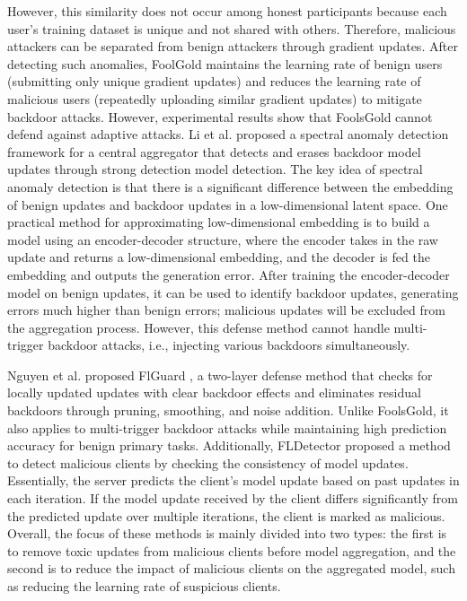\documentclass[conference]{IEEEtran}
\begin{document}
However, this similarity does not occur among honest participants because each user's training dataset is unique and not shared with others. 
Therefore, malicious attackers can be separated from benign attackers through gradient updates. After detecting such anomalies, 
FoolGold maintains the learning rate of benign users (submitting only unique gradient updates) and reduces the learning rate of malicious users 
(repeatedly uploading similar gradient updates) to mitigate backdoor attacks. However, experimental results show that 
FoolsGold cannot defend against adaptive attacks. Li et al. \cite{b79} proposed a spectral anomaly detection framework for a 
central aggregator that detects and erases backdoor model updates through strong detection model detection. 
The key idea of spectral anomaly detection is that there is a significant difference between the embedding 
of benign updates and backdoor updates in a low-dimensional latent space. One practical method for approximating 
low-dimensional embedding is to build a model using an encoder-decoder structure, where the encoder takes 
in the raw update and returns a low-dimensional embedding, and the decoder is fed the embedding and outputs 
the generation error. After training the encoder-decoder model on benign updates, it can be used to identify 
backdoor updates, generating errors much higher than benign errors; malicious updates will be excluded from 
the aggregation process. However, this defense method cannot handle multi-trigger backdoor attacks, i.e., 
injecting various backdoors simultaneously.   

Nguyen et al. proposed FlGuard \cite{b80}, a two-layer defense method that checks 
for locally updated updates with clear backdoor effects and eliminates residual backdoors through pruning, smoothing, and noise 
addition. Unlike FoolsGold\cite{b78}, it also applies to multi-trigger backdoor attacks while maintaining high prediction accuracy for benign primary tasks. 
Additionally, FLDetector \cite{b81} proposed a method to detect malicious clients by checking the consistency of model updates. Essentially, 
the server predicts the client's model update based on past updates in each iteration. If the model update received by the client 
differs significantly from the predicted update over multiple iterations, the client is marked as malicious. Overall, the focus of 
these methods is mainly divided into two types: the first is to remove toxic updates from malicious clients before model aggregation, 
and the second is to reduce the impact of malicious clients on the aggregated model, such as reducing the learning rate of suspicious clients.
\end{document}
